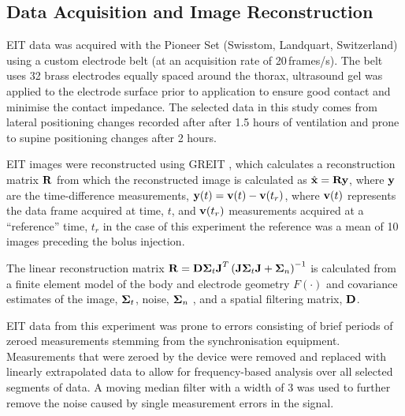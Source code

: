 \subsection{Data Acquisition and Image Reconstruction}

EIT data was acquired with the Pioneer Set (Swisstom, Landquart, Switzerland)
using a custom electrode belt (at an acquisition rate of 20\,frames/s).
The belt uses 32 brass electrodes equally spaced around the thorax, 
ultrasound gel was applied to the electrode surface prior to 
application to ensure good contact and minimise the contact impedance. 
The selected data in this study comes from lateral positioning changes recorded after
after 1.5 hours of ventilation and prone to supine positioning changes after 
2 hours.

EIT images were 
reconstructed using GREIT \parencite{adler_greit_2009}, %
which
calculates a reconstruction matrix $\mathbf{R}$ from which
the reconstructed image is calculated as $\hat{\mathbf{x}} = \mathbf{R} \mathbf{y}$,
where $\mathbf{y}$ are the time-difference
measurements,
$\mathbf{y}(t) = {\mbox{\bf v}}(t) - {\mbox{\bf v}}(t_r)$,
where ${\mbox{\bf v}}(t)$ represents 
the data frame acquired at time, $t$,
and ${\mbox{\bf v}}(t_r)$ measurements acquired at a 
``reference'' time, $t_r$ 
in the case of this experiment the reference was
a mean of 10 images preceding the bolus injection.

The linear reconstruction matrix $\mathbf{R}
 = \mathbf{D} \boldsymbol{\Sigma}_t {\mbox{\bf J}}^T 
    \left(
       {\mbox{\bf J}} \boldsymbol{\Sigma}_t {\mbox{\bf J}} + \boldsymbol{\Sigma}_n
    \right)^{-1}
$ is calculated from a
finite element model of the body and electrode geometry
$F(\cdot)$ and covariance estimates of the image, $\boldsymbol{\Sigma}_t$, 
noise, $\boldsymbol{\Sigma}_n$ \parencite{grychtol_3d_2016}, %
and
a spatial filtering matrix, $\mathbf{D}$.

EIT data from this experiment was prone to errors consisting of brief 
periods of zeroed measurements stemming 
from the synchronisation equipment. 
Measurements that were zeroed by the device were removed and replaced with linearly  
extrapolated data to allow for frequency-based analysis over all selected segments
of data.
A moving median filter with a width of 3 was used to further remove the
noise caused by single measurement errors in the signal.

%

